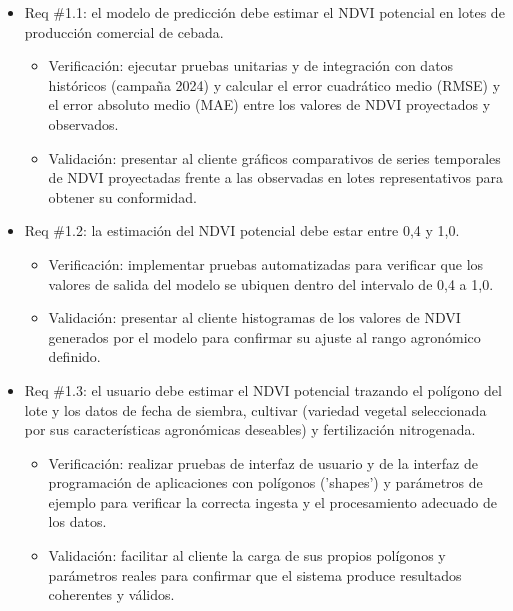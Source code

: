\documentclass[
11pt, %
]{charter}
\begin{document}
\begin{itemize}
    \item Req \#1.1: el modelo de predicción debe estimar el NDVI potencial en lotes de producción comercial de cebada.
    \begin{itemize}
        \item Verificación: ejecutar pruebas unitarias y de integración con datos históricos (campaña 2024) y calcular el error cuadrático medio (RMSE) y el error absoluto medio (MAE) entre los valores de NDVI proyectados y observados.
        \item Validación: presentar al cliente gráficos comparativos de series temporales de NDVI proyectadas frente a las observadas en lotes representativos para obtener su conformidad.
    \end{itemize}

    \item Req \#1.2: la estimación del NDVI potencial debe estar entre 0,4 y 1,0.
    \begin{itemize}
        \item Verificación: implementar pruebas automatizadas para verificar que los valores de salida del modelo se ubiquen dentro del intervalo de 0,4 a 1,0.
        \item Validación: presentar al cliente histogramas de los valores de NDVI generados por el modelo para confirmar su ajuste al rango agronómico definido.
    \end{itemize}

    \item Req \#1.3: el usuario debe estimar el NDVI potencial trazando el polígono del lote y los datos de fecha de siembra, cultivar (variedad vegetal seleccionada por sus características agronómicas deseables) y fertilización nitrogenada.
    \begin{itemize}
        \item Verificación: realizar pruebas de interfaz de usuario y de la interfaz de programación de aplicaciones con polígonos ('shapes') y parámetros de ejemplo para verificar la correcta ingesta y el procesamiento adecuado de los datos.
        \item Validación: facilitar al cliente la carga de sus propios polígonos y parámetros reales para confirmar que el sistema produce resultados coherentes y válidos.
    \end{itemize}


\end{itemize}
\end{document}
